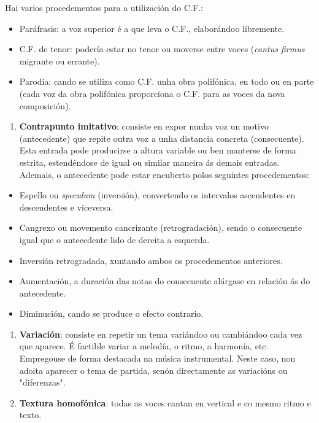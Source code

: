 \documentclass[
]{article}
\begin{document}
Hai varios procedementos para a utilización do C.F.:

\begin{itemize}
\item
  Paráfrasis: a voz superior é a que leva o C.F., elaborándoo
  libremente.
\item
  C.F. de tenor: podería estar no tenor ou moverse entre voces
  (\emph{cantus firmus} migrante ou errante).
\item
  Parodia: cando se utiliza como C.F. unha obra polifónica, en todo ou
  en parte (cada voz da obra polifónica proporciona o C.F. para as voces
  da nova composición).
\end{itemize}

\begin{enumerate}
\def\labelenumi{\arabic{enumi}.}
\item
  \textbf{Contrapunto imitativo}: consiste en expor nunha voz un motivo
  (antecedente) que repite outra voz a unha distancia concreta
  (consecuente). Esta entrada pode producirse a altura variable ou ben
  manterse de forma estrita, estendéndose de igual ou similar maneira ás
  demais entradas. Ademais, o antecedente pode estar encuberto polos
  seguintes procedementos:
\end{enumerate}

\begin{itemize}
\item
  Espello ou \emph{speculum} (inversión), convertendo os intervalos
  ascendentes en descendentes e viceversa.
\item
  Cangrexo ou movemento cancrizante (retrogradación), sendo o
  consecuente igual que o antecedente lido de dereita a esquerda.
\item
  Inversión retrogradada, xuntando ambos os procedementos anteriores.
\item
  Aumentación, a duración das notas do consecuente alárgase en relación
  ás do antecedente.
\item
  Diminución, cando se produce o efecto contrario.
\end{itemize}

\begin{enumerate}
\def\labelenumi{\arabic{enumi}.}
\item
  \textbf{Variación}: consiste en repetir un tema variándoo ou
  cambiándoo cada vez que aparece. É factible variar a melodía, o ritmo,
  a harmonía, etc. Empregouse de forma destacada na música instrumental.
  Neste caso, non adoita aparecer o tema de partida, senón directamente
  as variacións ou "diferenzas".
\item
  \textbf{Textura homofónica}: todas as voces cantan en vertical e co
  mesmo ritmo e texto.
\end{enumerate}
\end{document}
